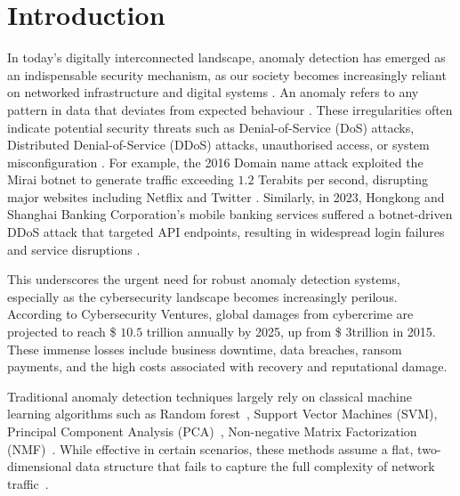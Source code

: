 \documentclass[pdflatex,sn-mathphys-num]{sn-jnl}
\theoremstyle{thmstyleone}
\theoremstyle{thmstyletwo}
\theoremstyle{thmstylethree}
\begin{document}

\maketitle


\section{Introduction}
In today's digitally interconnected landscape, anomaly detection has emerged as an indispensable security mechanism, as our society becomes increasingly reliant on networked infrastructure and digital systems \cite{rcglobal2021} . An anomaly refers to any pattern in data that deviates from expected behaviour \cite{patcha2007overview}. These irregularities often indicate potential security threats such as Denial-of-Service (DoS) attacks, Distributed Denial-of-Service (DDoS) attacks, unauthorised access, or system misconfiguration \cite{eren2023general}. For example, the 2016 Domain name attack exploited the Mirai botnet to generate traffic exceeding $1.2$ Terabits per second, disrupting major websites including Netflix and Twitter \cite{hilton2016dyn}. Similarly, in 2023, Hongkong and Shanghai Banking Corporation's mobile banking services suffered a botnet-driven DDoS attack that targeted API endpoints, resulting in widespread login failures and service disruptions \cite{paloaltonetworks2024}.

This underscores the urgent need for robust anomaly detection systems, especially as the cybersecurity landscape becomes increasingly perilous. According to Cybersecurity Ventures, global damages from cybercrime are projected to reach  \$ $10.5$ trillion annually by 2025, up from \$ $3 $trillion in 2015. These immense losses include business downtime, data breaches, ransom payments, and the high costs associated with recovery and reputational damage. 

Traditional anomaly detection techniques largely rely on classical machine learning algorithms such as Random forest~\cite{biau2016randomforest}, Support Vector Machines (SVM), Principal Component Analysis (PCA)~\cite{marukatat2022tutorial}, Non-negative Matrix Factorization (NMF)~\cite{lee2000nmf}. While effective in certain scenarios, these methods assume a flat, two-dimensional data structure that fails to capture the full complexity of network traffic~\cite{Su2025Robust}. 
\end{document}
